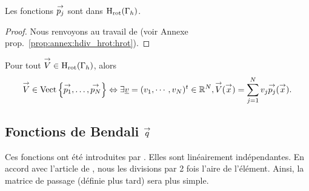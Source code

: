     \FloatBarrier

    \begin{prop}
      Les fonctions \({\overset{\rightarrow}{p_j}}\) sont dans \(\mathrm{H}_\mathrm{rot}(\Gamma_h)\).
    \end{prop}
    \begin{proof}
      Nous renvoyons au travail de \cite{nedelec_mixed_1980} (voir Annexe prop.~\ref{prop:annex:hdiv_hrot:hrot}).
    \end{proof}


    \begin{defn}
      Pour tout \({\overset{\rightarrow}{V}} \in \mathrm{H}_\mathrm{rot}(\Gamma_h)\), alors
      \begin{equation*}
        {\overset{\rightarrow}{V}} \in \operatorname{Vect}\left\lbrace{\overset{\rightarrow}{p_1}},\ldots,{\overset{\rightarrow}{p_N}}\right\rbrace \Leftrightarrow \exists {\underline{v}} = (v_1,\cdots,v_N)^t \in \mathbb R^N, {\overset{\rightarrow}{V}}({\overset{\rightarrow}{x}}) = \sum_{j=1}^N v_j {\overset{\rightarrow}{p_j}}({\overset{\rightarrow}{x}}).
      \end{equation*}
    \end{defn}

  \subsection[Fonctions de Bendali q]{Fonctions de Bendali \({\overset{\rightarrow}{q}}\)}

    Ces fonctions ont été introduites par \cite[eq.~28]{bendali_boundary-element_1999}.
    Elles sont linéairement indépendantes.
    En accord avec l'article de \cite[annexe~B]{stupfel_implementation_2015}, nous les divisions par 2 fois l'aire de l'élément.
    Ainsi, la matrice de passage (définie plus tard) sera plus simple.

